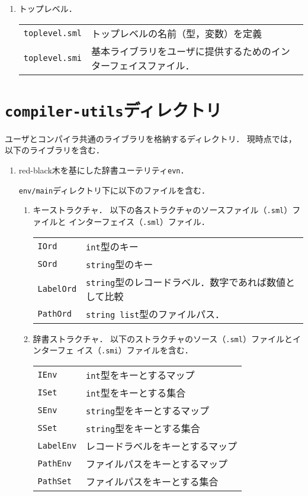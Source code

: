 \documentclass{jbook}
\newif\ifjp
\newcommand{\txt}[2]{#1}
\newcommand{\code}[1]{\mbox{\large\tt #1}}
\begin{document}
\begin{enumerate}
\item トップレベル．

\begin{tabular}{ll}
\code{toplevel.sml} & トップレベルの名前（型，変数）を定義
\\
\code{toplevel.smi} & 基本ライブラリをユーザに提供するためのインターフェイスファイル．
\end{tabular}
\end{enumerate}
\else%
\fi%

\section{\txt{\code{compiler-utils}ディレクトリ}{The \code{compiler-utils} Directory}}
\ifjp%
	ユーザとコンパイラ共通のライブラリを格納するディレクトリ．
	現時点では，以下のライブラリを含む．

\begin{enumerate}
\item red-black木を基にした辞書ユーテリティ\code{evn}．

	\code{env/main}ディレクトリ下に以下のファイルを含む．
\begin{enumerate}
\item キーストラクチャ．
	以下の各ストラクチャのソースファイル（\code{.sml}）ファイルと
インターフェイス（\code{.sml}）ファイル．
\begin{tabular}{ll}
\code{IOrd} & \code{int}型のキー\\
\code{SOrd} & \code{string}型のキー\\
\code{LabelOrd} & \code{string}型のレコードラベル．数字であれば数値として比較\\
\code{PathOrd} & \code{string list}型のファイルパス．
\end{tabular}

\item 辞書ストラクチャ．
	以下のストラクチャのソース（\code{.sml}）ファイルとインターフェ
イス（\code{.smi}）ファイルを含む．
\begin{tabular}{ll}
\code{IEnv} & \code{int}型をキーとするマップ
\\
\code{ISet} & \code{int}型をキーとする集合
\\
\code{SEnv} & \code{string}型をキーとするマップ
\\
\code{SSet} & \code{string}型をキーとする集合
\\
\code{LabelEnv} & レコードラベルをキーとするマップ
\\
\code{PathEnv} & ファイルパスをキーとするマップ
\\
\code{PathSet} & ファイルパスをキーとする集合
\end{tabular}
\end{enumerate}
\end{enumerate}
\end{document}
